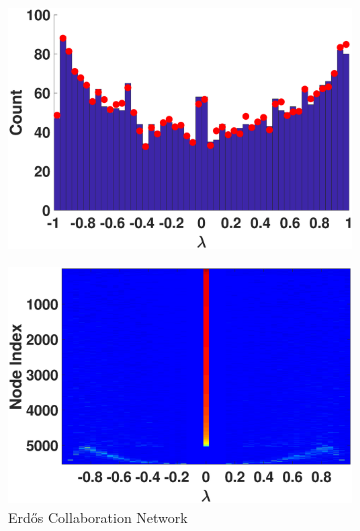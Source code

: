 \begin{figure}[htp]
\begin{subfigure}[t]{0.19\textwidth}
    \includegraphics[width=\textwidth,trim = .4cm 0.5cm 3.5cm 1.3cm,clip]
    {./ndos/pics/minnesota}
    \label{fig:minnesota_dos}
  \end{subfigure}
  \begin{subfigure}[t]{0.19\textwidth}
    \centering  
    \captionsetup{justification=centering,font=scriptsize}
    \includegraphics[width=\textwidth,trim = .4cm 0.5cm 3.5cm 1.3cm,clip]
    {./ndos/pics/erdos_ldos}
    \caption{Erd\H{o}s Collaboration Network}
    \label{fig:erdos_ldos}
  \end{subfigure}
  \begin{subfigure}[t]{0.19\textwidth}
    \centering  
    \captionsetup{justification=centering,font=scriptsize}

\end{subfigure}
\end{figure}
